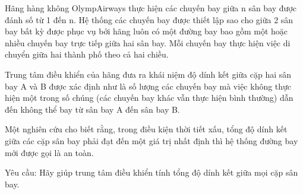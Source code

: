 Hãng hàng không OlympAirways thực hiện các chuyến bay giữa n sân bay được đánh số từ 1 đến n. Hệ thống các chuyến bay được thiết lập sao cho giữa 2 sân bay bất kỳ được   phục vụ bởi hãng luôn có một đường bay bao gồm một hoặc nhiều chuyến bay trực tiếp giữa hai sân bay. Mỗi chuyến bay thực hiện việc di chuyển giữa   hai thành phố theo cả hai chiều.  

   Trung tâm điều khiển của hãng đưa ra khái niệm độ dính kết giữa cặp hai sân bay A và B được xác định như là số lượng các chuyến bay mà việc không thực hiện một trong số chúng (các chuyến bay khác   vẫn thực hiện bình thường) dẫn đến không thể bay từ sân bay A đến sân bay B.  

   Một nghiên cứu cho biết rằng, trong điều kiện thời tiết xấu, tổng độ dính kết giữa các cặp sân bay phải đạt đến một giá trị nhất định thì hệ thống đường bay mới được gọi là an toàn.  

   Yêu cầu: Hãy giúp trung tâm điều khiển tính tổng độ dính kết giữa mọi cặp sân bay.  

\